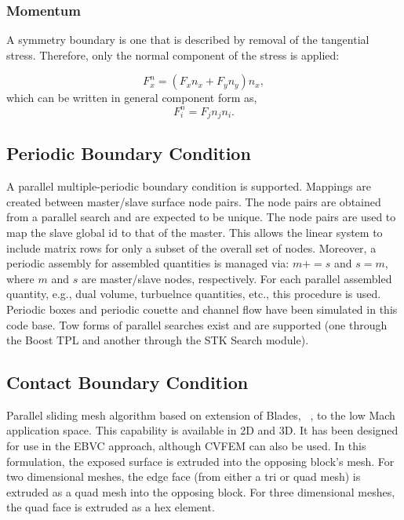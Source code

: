 \subsubsection{Momentum}
A symmetry boundary is one that is described by removal of the tangential stress. Therefore, only
the normal component of the stress is applied:

\begin{equation}
  F^n_x = (F_x n_x + F_y n_y ) n_x,
\end{equation}
which can be written in general component form as,
\begin{equation}
  F^n_i = F_j n_j n_i.
\end{equation}

\subsection{Periodic Boundary Condition}
A parallel multiple-periodic boundary condition is supported. Mappings are created between
master/slave surface node pairs. The node pairs are obtained from a parallel search and are expected
to be unique. The node pairs are used to map the slave global id to that of the master. This allows the linear
system to include matrix rows for only a subset of the overall set of nodes. Moreover, a periodic 
assembly for assembled quantities is managed via: $m+=s$ and $s=m$, where $m$ and $s$ are master/slave nodes, 
respectively. For each parallel assembled quantity, e.g., dual volume, turbuelnce quantities, etc., this procedure
is used. Periodic boxes and periodic couette and channel flow have been simulated in this code base. Tow forms of
parallel searches exist and are supported (one through the Boost TPL and another through the STK Search module).

\subsection{Contact Boundary Condition}
Parallel sliding mesh algorithm based on extension of Blades, ~\cite{Blades:2004}, to the low Mach application space. This capability is 
available in 2D and 3D. It has been designed for use in the EBVC approach, although CVFEM can also be used. 
In this formulation, the exposed  surface is extruded into the opposing block's mesh.
For two dimensional meshes, the edge face (from either a tri or quad mesh) is extruded as a quad mesh
into the opposing block. For three dimensional meshes, the quad face is extruded as a hex element.

